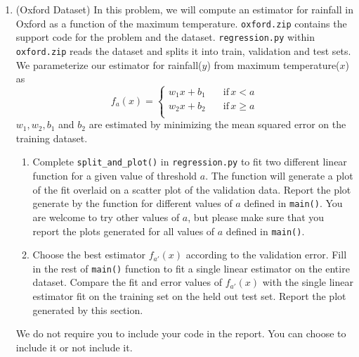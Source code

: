 \documentclass[12pt,twoside]{article}
\begin{document}
\begin{enumerate}
 \item (Oxford Dataset) In this problem, we will compute an estimator for rainfall in Oxford as a function of the maximum temperature. \verb|oxford.zip| contains the support code for the problem and the dataset. \verb|regression.py| within \verb|oxford.zip| reads the dataset and splits it into train, validation and test sets. We parameterize our estimator for rainfall($y$) from maximum temperature($x$) as 
  \begin{equation*}
f_a(x)=\begin{cases}
          w_1x + b_1 \quad &\text{if} \, x< a \\
         w_2x + b_2 &\text{if} \, x \geq a \\
     \end{cases}
 \end{equation*}
 $w_1, w_2, b_1$ and $b_2$ are estimated by minimizing the mean squared error on the training dataset. 
 \begin{enumerate}
 \item Complete \verb|split_and_plot()| in \verb|regression.py| to fit two different linear function for a given value of threshold $a$. The function will generate a plot of the fit overlaid on a scatter plot of the validation data. Report the plot generate by the function for different values of $a$ defined in \verb|main()|. You are welcome to try other values of $a$, but please make sure that you report the plots generated for all values of $a$ defined in \verb|main()|. 
 \item Choose the best estimator $f_{a'}(x)$ according to the validation error. Fill in the rest of \verb|main()| function to fit a single linear estimator on the entire dataset. Compare the fit and error values of $f_{a'}(x)$ with the single linear estimator fit on the training set on the held out test set.  Report the plot generated by this section. 
 \end{enumerate}
 We do not require you to include your code in the report. You can choose to include it or not include it. 
\end{enumerate}
\end{document}
